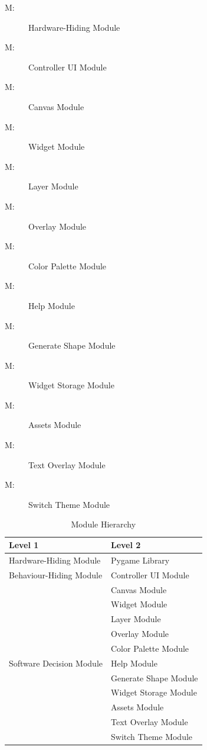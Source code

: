 \documentclass[12pt, titlepage]{article}
\newcounter{mnum}
\newcommand{\mthemnum}{M\themnum}
\begin{document}
\begin{description}
\item [ \mthemnum \label{mHH}:] Hardware-Hiding Module
\item [ \mthemnum \label{mUI}:] Controller UI Module
\item [ \mthemnum \label{mCV}:] Canvas Module
\item [ \mthemnum \label{mW}:] Widget Module
\item [ \mthemnum \label{mL}:] Layer Module
\item [ \mthemnum \label{mOL}:] Overlay Module
\item [ \mthemnum \label{mCP}:] Color Palette Module
\item [ \mthemnum \label{mH}:] Help Module
\item [ \mthemnum \label{mGS}:] Generate Shape Module
\item [ \mthemnum \label{mWS}:] Widget Storage Module
\item [ \mthemnum \label{mA}:] Assets Module
\color{red}
\item [ \mthemnum \label{mTO}:] Text Overlay Module
\item [ \mthemnum \label{mST}:] Switch Theme Module\color{black}
\end{description}


\begin{table}[h!]
\centering
\begin{tabular}{p{} p{}}
\toprule
\textbf{Level 1} & \textbf{Level 2}\\
\midrule

{Hardware-Hiding Module} & Pygame Library \\
\midrule

\multirow{1}{0.3\textwidth}{Behaviour-Hiding Module} & Controller UI Module\\
\midrule

\multirow{11}{0.3\textwidth}{Software Decision Module} & Canvas Module\\
& Widget Module\\
& Layer Module\\
& Overlay Module\\
& Color Palette Module\\
& Help Module\\
& Generate Shape Module\\
& Widget Storage Module\\
& Assets Module\\
& \color{red}Text Overlay Module\\
& \color{red}Switch Theme Module\\
\bottomrule

\end{tabular}
\caption{Module Hierarchy}
\label{TblMH}
\end{table}
\end{document}
